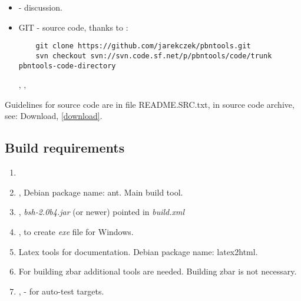 \documentclass[polish,a4paper,11pt,oneside]{article}
\begin{document}
\begin{itemize}
\item
   -
  discussion.
  
\item
  GIT - source code, thanks to 
  :
  \begin{verbatim}
    git clone https://github.com/jarekczek/pbntools.git
    svn checkout svn://svn.code.sf.net/p/pbntools/code/trunk pbntools-code-directory
  \end{verbatim}

  ,
  , 

\end{itemize}

Guidelines for source code are in file README.SRC.txt,
in source code archive, see: Download, \ref{download}.

\subsection{Build requirements}

\begin{enumerate}
\item
  \javajdk
\item
  , Debian package name: ant.
  Main build tool.
\item
  ,
  {\em bsh-2.0b4.jar} (or newer) pointed in {\em build.xml}
\item
  ,
  to create {\em exe} file for Windows.
\item
  Latex tools for documentation. Debian package name: latex2html.
\item
  For building zbar additional tools are needed.
  Building zbar is not necessary.
\item
  ,
  - for auto-test targets.


\end{enumerate}
\end{document}
